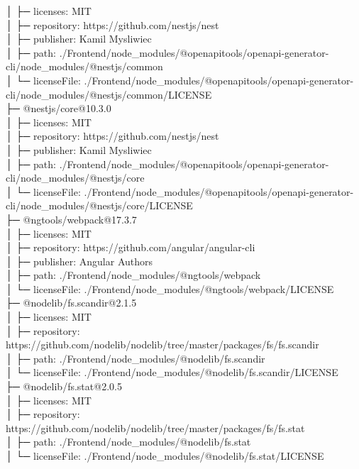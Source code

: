 \documentclass[
    paper=a4,
    twoside=false,
    parskip=half,
    listof=entryprefix,
    listof=totoc,
    index=totoc,
    bibliography=totoc,
    headsepline,
]{scrbook}
\begin{document}
    │  ├─ licenses: MIT\\
    │  ├─ repository: https://github.com/nestjs/nest\\
    │  ├─ publisher: Kamil Mysliwiec\\
    │  ├─ path: ./Frontend/node\_modules/@openapitools/openapi-generator-cli/node\_modules/@nestjs/common\\
    │  └─ licenseFile: ./Frontend/node\_modules/@openapitools/openapi-generator-cli/node\_modules/@nestjs/common/LICENSE\\
    ├─ @nestjs/core@10.3.0\\
    │  ├─ licenses: MIT\\
    │  ├─ repository: https://github.com/nestjs/nest\\
    │  ├─ publisher: Kamil Mysliwiec\\
    │  ├─ path: ./Frontend/node\_modules/@openapitools/openapi-generator-cli/node\_modules/@nestjs/core\\
    │  └─ licenseFile: ./Frontend/node\_modules/@openapitools/openapi-generator-cli/node\_modules/@nestjs/core/LICENSE\\
    ├─ @ngtools/webpack@17.3.7\\
    │  ├─ licenses: MIT\\
    │  ├─ repository: https://github.com/angular/angular-cli\\
    │  ├─ publisher: Angular Authors\\
    │  ├─ path: ./Frontend/node\_modules/@ngtools/webpack\\
    │  └─ licenseFile: ./Frontend/node\_modules/@ngtools/webpack/LICENSE\\
    ├─ @nodelib/fs.scandir@2.1.5\\
    │  ├─ licenses: MIT\\
    │  ├─ repository: https://github.com/nodelib/nodelib/tree/master/packages/fs/fs.scandir\\
    │  ├─ path: ./Frontend/node\_modules/@nodelib/fs.scandir\\
    │  └─ licenseFile: ./Frontend/node\_modules/@nodelib/fs.scandir/LICENSE\\
    ├─ @nodelib/fs.stat@2.0.5\\
    │  ├─ licenses: MIT\\
    │  ├─ repository: https://github.com/nodelib/nodelib/tree/master/packages/fs/fs.stat\\
    │  ├─ path: ./Frontend/node\_modules/@nodelib/fs.stat\\
    │  └─ licenseFile: ./Frontend/node\_modules/@nodelib/fs.stat/LICENSE\\
\end{document}
